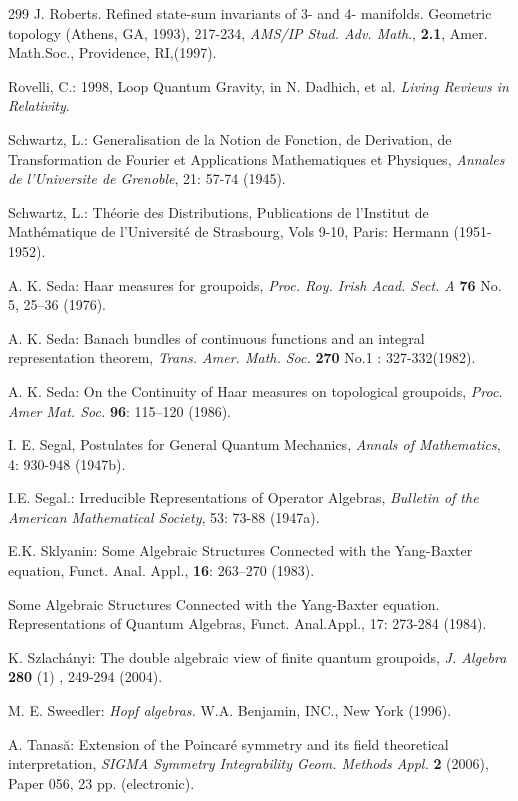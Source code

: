 \documentclass[12pt]{article}
\theoremstyle{plain}
\theoremstyle{definition}
\numberwithin{equation}{section}
\begin{document}
\begin{thebibliography} {299}
 J. Roberts. Refined state-sum invariants of 3- and 4- manifolds. Geometric topology
(Athens, GA, 1993), 217-234, \textit{AMS/IP Stud. Adv. Math}., \textbf{2.1}, Amer. Math.Soc., Providence, RI,(1997).

Rovelli, C.: 1998, Loop Quantum Gravity, in N. Dadhich, et al. {\em Living Reviews in Relativity}.


Schwartz, L.: Generalisation de la Notion de Fonction, de Derivation, de Transformation
de Fourier et Applications Mathematiques et Physiques, \textit{Annales de l'Universite de Grenoble},
21: 57-74 (1945).

Schwartz, L.: Th\'eorie des Distributions, Publications de l'Institut de Math\'ematique
de l'Universit\'e de Strasbourg, Vols 9-10, Paris: Hermann (1951-1952).

A. K. Seda: Haar measures for groupoids, \emph{Proc. Roy. Irish Acad.
Sect. A} \textbf{76} No. 5, 25--36 (1976).

A. K. Seda: Banach bundles of continuous functions and an integral
representation theorem, \emph{Trans. Amer. Math. Soc.} \textbf{270} No.1 : 327-332(1982).

A. K. Seda: On the Continuity of Haar measures on topological groupoids, \emph{Proc. Amer Mat. Soc.} \textbf{96}: 115--120 (1986).

I. E. Segal, Postulates for General Quantum Mechanics, {\em Annals of Mathematics}, 4:
930-948 (1947b).

I.E. Segal.: Irreducible Representations of Operator Algebras, {\em Bulletin of the
American Mathematical Society}, 53: 73-88 (1947a).

E.K. Sklyanin: Some Algebraic Structures Connected with the Yang-Baxter equation, Funct. Anal. Appl., \textbf{16}: 263--270 (1983).

Some Algebraic Structures Connected with the Yang-Baxter equation. Representations of Quantum Algebras, Funct. Anal.Appl., 17: 273-284 (1984).

K. Szlach\'anyi: The double algebraic view of finite quantum
groupoids, \emph{J. Algebra} \textbf{280} (1) , 249-294 (2004).

M. E. Sweedler: \textit{Hopf algebras.} W.A. Benjamin, INC., New
York (1996).

A. Tanas\u a: Extension of the Poincar\'e symmetry and its field
theoretical interpretation, \emph{SIGMA Symmetry Integrability
Geom. Methods Appl.} \textbf{2} (2006), Paper 056, 23 pp.
(electronic).


\end{thebibliography}
\end{document}
